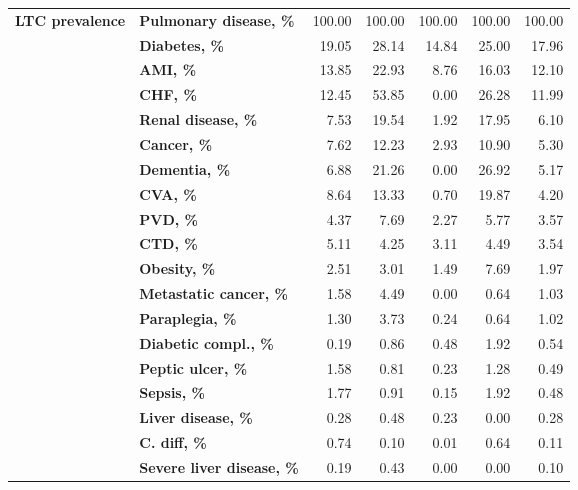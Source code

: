 \documentclass[11pt]{article}
\begin{document}
\begin{table}
{\begin{tabular}{llrrrrr}
        \textbf{LTC prevalence} & \textbf{Pulmonary disease, \%} &   100.00 &   100.00 &   100.00 &    100.00 &     100.00 \\
               & \textbf{Diabetes, \%} &    19.05 &    28.14 &    14.84 &     25.00 &      17.96 \\
               & \textbf{AMI, \%} &    13.85 &    22.93 &     8.76 &     16.03 &      12.10 \\
               & \textbf{CHF, \%} &    12.45 &    53.85 &     0.00 &     26.28 &      11.99 \\
               & \textbf{Renal disease, \%} &     7.53 &    19.54 &     1.92 &     17.95 &       6.10 \\
               & \textbf{Cancer, \%} &     7.62 &    12.23 &     2.93 &     10.90 &       5.30 \\
               & \textbf{Dementia, \%} &     6.88 &    21.26 &     0.00 &     26.92 &       5.17 \\
               & \textbf{CVA, \%} &     8.64 &    13.33 &     0.70 &     19.87 &       4.20 \\
               & \textbf{PVD, \%} &     4.37 &     7.69 &     2.27 &      5.77 &       3.57 \\
               & \textbf{CTD, \%} &     5.11 &     4.25 &     3.11 &      4.49 &       3.54 \\
               & \textbf{Obesity, \%} &     2.51 &     3.01 &     1.49 &      7.69 &       1.97 \\
               & \textbf{Metastatic cancer, \%} &     1.58 &     4.49 &     0.00 &      0.64 &       1.03 \\
               & \textbf{Paraplegia, \%} &     1.30 &     3.73 &     0.24 &      0.64 &       1.02 \\
               & \textbf{Diabetic compl., \%} &     0.19 &     0.86 &     0.48 &      1.92 &       0.54 \\
               & \textbf{Peptic ulcer, \%} &     1.58 &     0.81 &     0.23 &      1.28 &       0.49 \\
               & \textbf{Sepsis, \%} &     1.77 &     0.91 &     0.15 &      1.92 &       0.48 \\
               & \textbf{Liver disease, \%} &     0.28 &     0.48 &     0.23 &      0.00 &       0.28 \\
               & \textbf{C. diff, \%} &     0.74 &     0.10 &     0.01 &      0.64 &       0.11 \\
               & \textbf{Severe liver disease, \%} &     0.19 &     0.43 &     0.00 &      0.00 &       0.10 \\

\end{tabular}}
\end{table}
\end{document}
